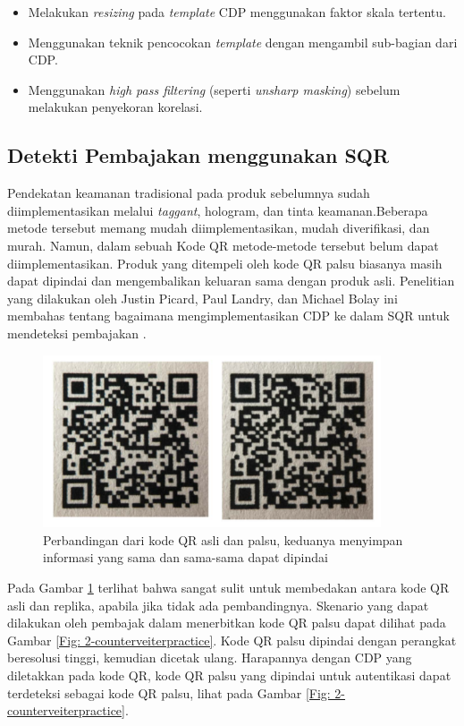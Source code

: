 \begin{itemize}
	\item Melakukan \emph{resizing} pada \emph{template} CDP menggunakan faktor skala tertentu.
	\item Menggunakan teknik pencocokan \emph{template} dengan mengambil sub-bagian dari CDP.
	\item Menggunakan \emph{high pass filtering} (seperti \emph{unsharp masking}) sebelum melakukan penyekoran korelasi.
\end{itemize}

\subsection{Detekti Pembajakan menggunakan SQR}
Pendekatan keamanan tradisional pada produk sebelumnya sudah diimplementasikan melalui \emph{taggant}, hologram, dan tinta keamanan.Beberapa metode tersebut memang mudah diimplementasikan, mudah diverifikasi, dan murah. Namun, dalam sebuah Kode QR metode-metode tersebut belum dapat diimplementasikan. Produk yang ditempeli oleh kode QR palsu biasanya masih dapat dipindai dan mengembalikan keluaran sama dengan produk asli. Penelitian yang dilakukan oleh Justin Picard, Paul Landry, dan Michael Bolay ini membahas tentang bagaimana mengimplementasikan CDP ke dalam SQR untuk mendeteksi pembajakan \cite{picard2021counterfeit}.

\begin{figure}[h]
	\centering
	\includegraphics[width=10cm]{contents/chapter-2/2-qrorivspalsu.jpg}
	\caption{Perbandingan dari kode QR asli dan palsu, keduanya menyimpan informasi yang sama dan sama-sama dapat dipindai \cite{picard2021counterfeit}}
	\label{Fig: 2-qrorivspalsu}
\end{figure}

Pada Gambar \ref{Fig: 2-qrorivspalsu} terlihat bahwa sangat sulit untuk membedakan antara kode QR asli dan replika, apabila jika tidak ada pembandingnya. Skenario yang dapat dilakukan oleh pembajak dalam menerbitkan kode QR palsu dapat dilihat pada Gambar \ref{Fig: 2-counterveiterpractice}. Kode QR palsu dipindai dengan perangkat beresolusi tinggi, kemudian dicetak ulang. Harapannya dengan CDP yang diletakkan pada kode QR, kode QR palsu yang dipindai untuk autentikasi dapat terdeteksi sebagai kode QR palsu, lihat pada Gambar \ref{Fig: 2-counterveiterpractice}.

